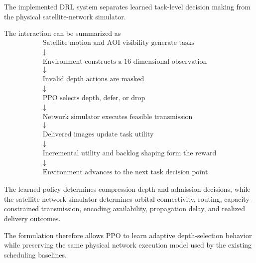 \documentclass[11pt]{article}
\begin{document}
The implemented DRL system separates learned task-level decision making from
the physical satellite-network simulator.

The interaction can be summarized as
\[
\boxed{
\begin{array}{c}
\text{Satellite motion and AOI visibility generate tasks}\\
\downarrow\\
\text{Environment constructs a 16-dimensional observation}\\
\downarrow\\
\text{Invalid depth actions are masked}\\
\downarrow\\
\text{PPO selects depth, defer, or drop}\\
\downarrow\\
\text{Network simulator executes feasible transmission}\\
\downarrow\\
\text{Delivered images update task utility}\\
\downarrow\\
\text{Incremental utility and backlog shaping form the reward}\\
\downarrow\\
\text{Environment advances to the next task decision point}
\end{array}
}
\]

The learned policy determines compression-depth and admission decisions,
while the satellite-network simulator determines orbital connectivity,
routing, capacity-constrained transmission, encoding availability,
propagation delay, and realized delivery outcomes.

The formulation therefore allows PPO to learn adaptive depth-selection
behavior while preserving the same physical network execution model used by
the existing scheduling baselines.
\end{document}
